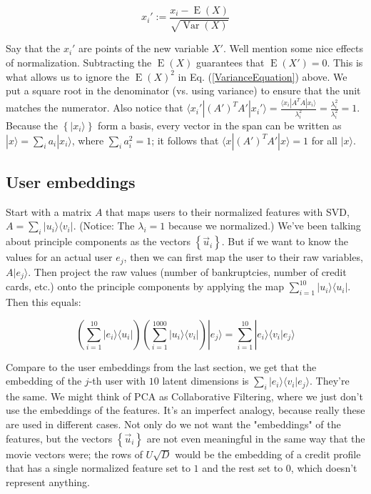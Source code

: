 \documentclass{amsbook}
\begin{document}
$$
x_i':=\frac{x_i-\operatorname{E}(X)}{\sqrt{\operatorname{Var}(X)}}
$$

Say that the $x_i'$ are points of the new variable $X'$.  Well mention some nice effects of normalization.  Subtracting the $\operatorname{E}(X)$ guarantees that $\operatorname{E}(X')=0$.  This is what allows us to ignore the $\operatorname{E}(X)^2$ in Eq. (\ref{VarianceEquation}) above.  We put a square root in the denominator (vs. using variance) to ensure that the unit matches the numerator.  Also notice that $\langle x_i'|(A')^TA'|x_i'\rangle=\frac{\langle x_i|A^TA|x_i\rangle}{\lambda_i^2} = \frac{\lambda_i^2}{\lambda_i^2}=1$.  Because the $\left\{|x_i\rangle\right\}$ form a basis, every vector in the span can be written as $|x\rangle=\sum_ia_i|x_i\rangle$, where $\sum_ia_i^2=1$; it follows that $\langle x|(A')^TA'|x\rangle=1$ for all $|x\rangle$.

\subsection{User embeddings}

Start with a matrix $A$ that maps users to their normalized features with SVD, $A=\sum_i|u_i\rangle\langle v_i|$.  (Notice:  The $\lambda_i=1$ because we normalized.)  We've been talking about principle components as the vectors $\left\{\vec u_i\right\}$.  But if we want to know the values for an actual user $e_j$, then we can first map the user to their raw variables, $A|e_j\rangle$.  Then project the raw values (number of bankruptcies, number of credit cards, etc.) onto the principle components by applying the map $\sum_{i=1}^{10}|u_i\rangle\langle u_i|$.  Then this equals:

$$
\left(\sum_{i=1}^{10}|e_i\rangle\langle u_i|\right)\left(\sum_{i=1}^{1000}|u_i\rangle\langle v_i|\right)|e_j\rangle = \sum_{i=1}^{10}|e_i\rangle\langle v_i|e_j\rangle
$$

Compare to the user embeddings from the last section, we get that the embedding of the $j$-th user with $10$ latent dimensions is $\sum_i|e_i\rangle\langle v_i|e_j\rangle$.  They're the same.  We might think of PCA as Collaborative Filtering, where we just don't use the embeddings of the features.  It's an imperfect analogy, because really these are used in different cases.  Not only do we not want the "embeddings" of the features, but the vectors $\left\{\vec u_i\right\}$ are not even meaningful in the same way that the movie vectors were; the rows of $U\sqrt D$ would be the embedding of a credit profile that has a single normalized feature set to $1$ and the rest set to $0$, which doesn't represent anything.
\end{document}

